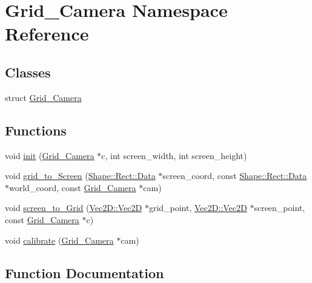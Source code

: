 \hypertarget{namespace_grid___camera}{}\section{Grid\+\_\+\+Camera Namespace Reference}
\label{namespace_grid___camera}
\subsection*{Classes}
\begin{DoxyCompactItemize}
\item 
struct \mbox{\hyperlink{struct_grid___camera_1_1_grid___camera}{Grid\+\_\+\+Camera}}
\end{DoxyCompactItemize}
\subsection*{Functions}
\begin{DoxyCompactItemize}
\item 
void \mbox{\hyperlink{namespace_grid___camera_af5f52d39f4bcbd92342e1ffd74883184}{init}} (\mbox{\hyperlink{struct_grid___camera_1_1_grid___camera}{Grid\+\_\+\+Camera}} $\ast$c, int screen\+\_\+width, int screen\+\_\+height)
\item 
void \mbox{\hyperlink{namespace_grid___camera_a081f5cda2f2c730879879bbb0ae895a9}{grid\+\_\+to\+\_\+\+Screen}} (\mbox{\hyperlink{struct_shape_1_1_rect_1_1_data}{Shape\+::\+Rect\+::\+Data}} $\ast$screen\+\_\+coord, const \mbox{\hyperlink{struct_shape_1_1_rect_1_1_data}{Shape\+::\+Rect\+::\+Data}} $\ast$world\+\_\+coord, const \mbox{\hyperlink{struct_grid___camera_1_1_grid___camera}{Grid\+\_\+\+Camera}} $\ast$cam)
\item 
void \mbox{\hyperlink{namespace_grid___camera_af25668fea8e588c3bebb6841bb3ec4c8}{screen\+\_\+to\+\_\+\+Grid}} (\mbox{\hyperlink{struct_vec2_d_1_1_vec2_d}{Vec2\+D\+::\+Vec2D}} $\ast$grid\+\_\+point, \mbox{\hyperlink{struct_vec2_d_1_1_vec2_d}{Vec2\+D\+::\+Vec2D}} $\ast$screen\+\_\+point, const \mbox{\hyperlink{struct_grid___camera_1_1_grid___camera}{Grid\+\_\+\+Camera}} $\ast$c)
\item 
void \mbox{\hyperlink{namespace_grid___camera_a2e18721620d9810d83113b4ef0e6b390}{calibrate}} (\mbox{\hyperlink{struct_grid___camera_1_1_grid___camera}{Grid\+\_\+\+Camera}} $\ast$cam)
\end{DoxyCompactItemize}


\subsection{Function Documentation}
\mbox{\label{namespace_grid___camera_a2e18721620d9810d83113b4ef0e6b390}} 
